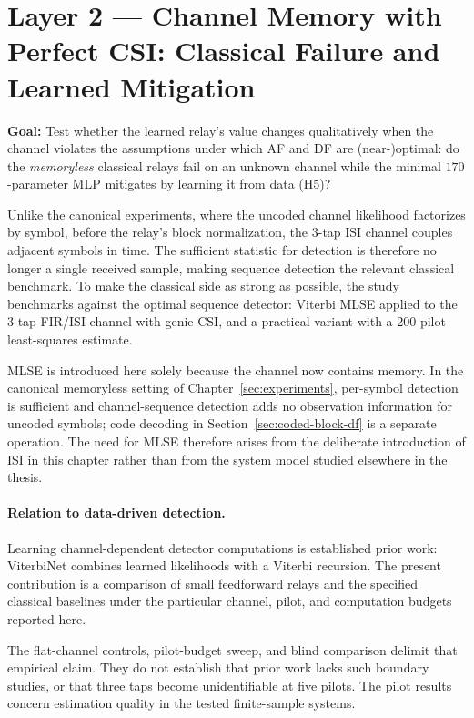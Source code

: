 \section{Layer 2 --- Channel Memory with Perfect CSI: Classical Failure and Learned Mitigation}\label{sec:unknown-channel-experiment}

\textbf{Goal:} Test whether the learned relay's value changes qualitatively when the channel violates the assumptions under which AF and DF are (near-)optimal: do the \emph{memoryless} classical relays fail on an unknown channel while the minimal $170$-parameter MLP mitigates by learning it from data (H5)?

Unlike the canonical experiments, where the uncoded channel likelihood factorizes by symbol, before the relay's block normalization, the 3-tap ISI channel couples adjacent symbols in time. The sufficient statistic for detection is therefore no longer a single received sample, making sequence detection the relevant classical benchmark. To make the classical side as strong as possible, the study benchmarks against the optimal sequence detector: Viterbi MLSE applied to the 3-tap FIR/ISI channel \cite{Forney1972MLSE} with genie CSI, and a practical variant with a 200-pilot least-squares estimate.

MLSE is introduced here solely because the channel now contains memory. In the canonical memoryless setting of Chapter~\ref{sec:experiments}, per-symbol detection is sufficient and channel-sequence detection adds no observation information for uncoded symbols; code decoding in Section~\ref{sec:coded-block-df} is a separate operation. The need for MLSE therefore arises from the deliberate introduction of ISI in this chapter rather than from the system model studied elsewhere in the thesis.

\paragraph{Relation to data-driven detection.} Learning channel-dependent detector computations is established prior work: ViterbiNet \cite{Shlezinger2020ViterbiNet} combines learned likelihoods with a Viterbi recursion. The present contribution is a comparison of small feedforward relays and the specified classical baselines under the particular channel, pilot, and computation budgets reported here.

The flat-channel controls, pilot-budget sweep, and blind comparison delimit that empirical claim. They do not establish that prior work lacks such boundary studies, or that three taps become unidentifiable at five pilots. The pilot results concern estimation quality in the tested finite-sample systems.

